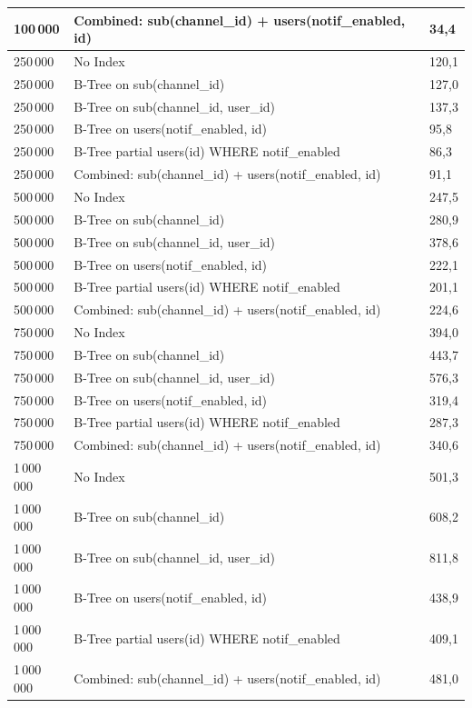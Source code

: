 \begin{longtable}{|p{2.4cm}|p{9.9cm}|p{2.3cm}|}
    100\,000 & Combined: sub(channel\_id) + users(notif\_enabled, id) & 34,4 \\
    \hline
    250\,000 & No Index & 120,1 \\
    \hline
    250\,000 & B-Tree on sub(channel\_id) & 127,0 \\
    \hline
    250\,000 & B-Tree on sub(channel\_id, user\_id) & 137,3 \\
    \hline
    250\,000 & B-Tree on users(notif\_enabled, id) & 95,8 \\
    \hline
    250\,000 & B-Tree partial users(id) WHERE notif\_enabled & 86,3 \\
    \hline
    250\,000 & Combined: sub(channel\_id) + users(notif\_enabled, id) & 91,1 \\
    \hline
    500\,000 & No Index & 247,5 \\
    \hline
    500\,000 & B-Tree on sub(channel\_id) & 280,9 \\
    \hline
    500\,000 & B-Tree on sub(channel\_id, user\_id) & 378,6 \\
    \hline
    500\,000 & B-Tree on users(notif\_enabled, id) & 222,1 \\
    \hline
    500\,000 & B-Tree partial users(id) WHERE notif\_enabled & 201,1 \\
    \hline
    500\,000 & Combined: sub(channel\_id) + users(notif\_enabled, id) & 224,6 \\
    \hline
    750\,000 & No Index & 394,0 \\
    \hline
    750\,000 & B-Tree on sub(channel\_id) & 443,7 \\
    \hline
    750\,000 & B-Tree on sub(channel\_id, user\_id) & 576,3 \\
    \hline
    750\,000 & B-Tree on users(notif\_enabled, id) & 319,4 \\
    \hline
    750\,000 & B-Tree partial users(id) WHERE notif\_enabled & 287,3 \\
    \hline
    750\,000 & Combined: sub(channel\_id) + users(notif\_enabled, id) & 340,6 \\
    \hline
    1\,000\,000 & No Index & 501,3 \\
    \hline
    1\,000\,000 & B-Tree on sub(channel\_id) & 608,2 \\
    \hline
    1\,000\,000 & B-Tree on sub(channel\_id, user\_id) & 811,8 \\
    \hline
    1\,000\,000 & B-Tree on users(notif\_enabled, id) & 438,9 \\
    \hline
    1\,000\,000 & B-Tree partial users(id) WHERE notif\_enabled & 409,1 \\
    \hline
    1\,000\,000 & Combined: sub(channel\_id) + users(notif\_enabled, id) & 481,0 \\
    \hline
\end{longtable}

